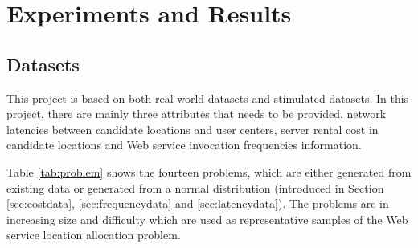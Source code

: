 % 
% 


\section{Experiments and Results}
\subsection{Datasets}
\label{sec:datasets}
This project is based on both real world datasets and stimulated datasets. 
In this project, there are mainly three attributes that needs to be provided, 
network latencies between candidate locations and user centers,  server rental cost in candidate locations 
and Web service invocation frequencies information.

Table \ref{tab:problem} shows the fourteen problems, 
which are either generated from existing data or generated from a normal distribution (introduced in Section \ref{sec:costdata}, \ref{sec:frequencydata} and \ref{sec:latencydata}).  
The problems are in increasing size and difficulty which are used as representative samples of the Web service 
location allocation problem.

